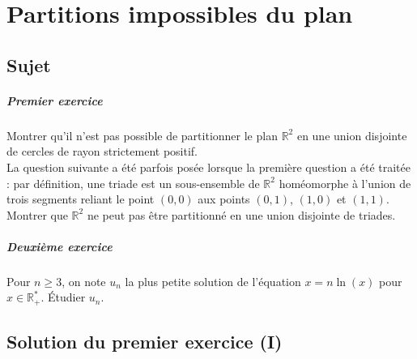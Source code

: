 \chapter{Partitions impossibles du plan}

\section{Sujet}

\paragraph{Premier exercice}
Montrer qu'il n'est pas possible de partitionner le plan $\mathbb{R}^2 $ en une union disjointe de cercles de rayon strictement positif.\\
La question suivante a été parfois posée lorsque la première question a été traitée : par définition, une triade est un sous-ensemble de $\mathbb{R}^2 $ homéomorphe à l'union de trois segments reliant le point $(0, 0)$ aux points $(0, 1)$, $(1, 0)$ et $(1, 1)$. Montrer que $\mathbb{R}^2 $ ne peut pas être partitionné en une union disjointe de triades.

\paragraph{Deuxième exercice}
Pour $n \geqslant 3$, on note $u_n$ la plus petite solution de l'équation $x = n \ln(x)$ pour $x \in \mathbb R_+^*$. Étudier $u_n$.

\section{Solution du premier exercice (I)} %

